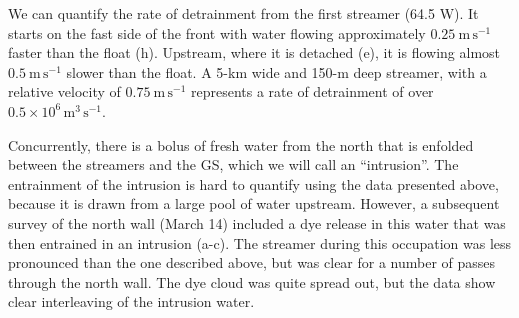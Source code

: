 \documentclass{natureJMK}
\begin{document}
We can quantify the rate of detrainment from the first streamer (64.5 W). It starts on the fast side of the front with water flowing approximately $0.25\ \mathrm{m\,s^{-1}}$ faster than the float (h). Upstream, where it is detached (e), it is flowing almost $0.5\ \mathrm{m\,s^{-1}}$ slower than the float.  A 5-km wide and 150-m deep streamer,  with a relative velocity of $0.75\ \mathrm{m\,s^{-1}}$ represents a rate of detrainment of over $0.5\times10^{6}\, \mathrm{m^{3}\,s^{-1}}$.  


Concurrently, there is a bolus of fresh water from the north that is enfolded between the streamers and the GS, which we will call an ``intrusion''. The entrainment of the intrusion is hard to quantify using the data presented above, because it is drawn from a large pool of water upstream.  However, a subsequent survey of the north wall (March 14) included a dye release in this water that was then entrained in an intrusion (a-c). The streamer during this occupation was less pronounced than the one described above, but was clear for a number of passes through the north wall.  The dye cloud was quite spread out, but the data show clear interleaving of the intrusion water.  
\end{document}
